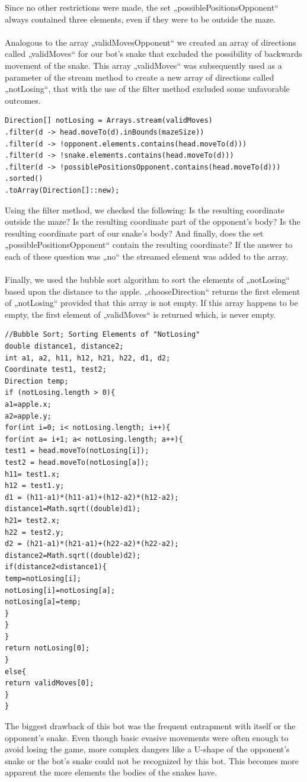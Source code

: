 \documentclass[a4paper,12pt]{article}
\begin{document}
Since no other restrictions were made, the set „possiblePositionsOpponent“ always contained three
elements, even if they were to be outside the maze.\\
\\
Analogous to the array „validMovesOpponent“ we created an array of directions called
„validMoves“ for our bot’s snake that excluded the possibility of backwards movement of the
snake. This array „validMoves“ was subsequently used as a parameter of the stream method to
create a new array of directions called „notLosing“, that with the use of the filter method excluded
some unfavorable outcomes.
\begin{verbatim}
Direction[] notLosing = Arrays.stream(validMoves)
.filter(d -> head.moveTo(d).inBounds(mazeSize))
.filter(d -> !opponent.elements.contains(head.moveTo(d)))
.filter(d -> !snake.elements.contains(head.moveTo(d)))
.filter(d -> !possiblePositionsOpponent.contains(head.moveTo(d)))
.sorted()
.toArray(Direction[]::new);
\end{verbatim}

Using the filter method, we checked the following: Is the resulting coordinate outside the
maze? Is the resulting coordinate part of the opponent’s body? Is the resulting coordinate
part of our snake’s body? And finally, does the set „possiblePositionsOpponent“ contain the
resulting coordinate? If the answer to each of these question was „no“ the streamed element
was added to the array.\\
\\
Finally, we used the bubble sort algorithm to sort the elements of „notLosing“ based upon
the distance to the apple. „chooseDirection“ returns the first element of „notLosing“
provided that this array is not empty. If this array happens to be empty, the first element of
„validMoves“ is returned which, is never empty.
\begin{verbatim}
//Bubble Sort; Sorting Elements of "NotLosing"
double distance1, distance2;
int a1, a2, h11, h12, h21, h22, d1, d2;
Coordinate test1, test2;
Direction temp;
if (notLosing.length > 0){
a1=apple.x;
a2=apple.y;
for(int i=0; i< notLosing.length; i++){
for(int a= i+1; a< notLosing.length; a++){
test1 = head.moveTo(notLosing[i]);
test2 = head.moveTo(notLosing[a]);
h11= test1.x;
h12 = test1.y;
d1 = (h11-a1)*(h11-a1)+(h12-a2)*(h12-a2);
distance1=Math.sqrt((double)d1);
h21= test2.x;
h22 = test2.y;
d2 = (h21-a1)*(h21-a1)+(h22-a2)*(h22-a2);
distance2=Math.sqrt((double)d2);
if(distance2<distance1){
temp=notLosing[i];
notLosing[i]=notLosing[a];
notLosing[a]=temp;
}
}
}
return notLosing[0];
}
else{
return validMoves[0];
}
}
\end{verbatim}
The biggest drawback of this bot was the frequent entrapment with itself or the opponent's snake. 
Even though basic evasive movements were often enough to avoid losing the game, more complex dangers like a U-shape of the opponent's
snake or the bot’s snake could not be recognized by this bot. This becomes more apparent the more elements the bodies of the snakes have.
\end{document}
